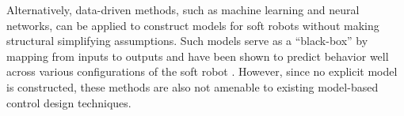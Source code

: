 Alternatively, data-driven methods, such as machine learning and neural networks, can be applied to construct models for soft robots without making structural simplifying assumptions.
Such models serve as a ``black-box'' by mapping from inputs to outputs and have been shown to predict behavior well across various configurations of the soft robot  \cite{gillespie2018learning, thuruthel2018model}.
However, since no explicit model is constructed, these methods are also not amenable to existing model-based control design techniques.


